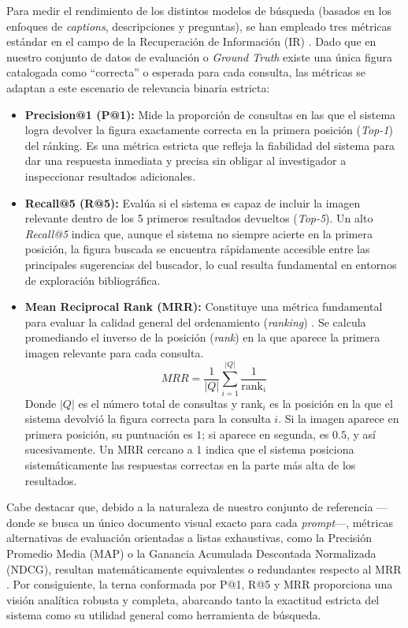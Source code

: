 \documentclass[a4paper]{report}
\begin{document}
Para medir el rendimiento de los distintos modelos de búsqueda (basados en los enfoques de \textit{captions}, descripciones y preguntas), se han empleado tres métricas estándar en el campo de la Recuperación de Información (IR) \cite{manning2008introduction}. Dado que en nuestro conjunto de datos de evaluación o \textit{Ground Truth} existe una única figura catalogada como ``correcta'' o esperada para cada consulta, las métricas se adaptan a este escenario de relevancia binaria estricta:

\begin{itemize}
    \item \textbf{Precision@1 (P@1):} Mide la proporción de consultas en las que el sistema logra devolver la figura exactamente correcta en la primera posición (\textit{Top-1}) del ránking. Es una métrica estricta que refleja la fiabilidad del sistema para dar una respuesta inmediata y precisa sin obligar al investigador a inspeccionar resultados adicionales.
    
    \item \textbf{Recall@5 (R@5):} Evalúa si el sistema es capaz de incluir la imagen relevante dentro de los 5 primeros resultados devueltos (\textit{Top-5}). Un alto \textit{Recall@5} indica que, aunque el sistema no siempre acierte en la primera posición, la figura buscada se encuentra rápidamente accesible entre las principales sugerencias del buscador, lo cual resulta fundamental en entornos de exploración bibliográfica.
    
    \item \textbf{Mean Reciprocal Rank (MRR):} Constituye una métrica fundamental para evaluar la calidad general del ordenamiento (\textit{ranking}) \cite{craswell2009mean}. Se calcula promediando el inverso de la posición (\textit{rank}) en la que aparece la primera imagen relevante para cada consulta.
    \begin{equation}
        MRR = \frac{1}{|Q|} \sum_{i=1}^{|Q|} \frac{1}{\text{rank}_i}
    \end{equation}
    Donde $|Q|$ es el número total de consultas y $\text{rank}_i$ es la posición en la que el sistema devolvió la figura correcta para la consulta $i$. Si la imagen aparece en primera posición, su puntuación es $1$; si aparece en segunda, es $0.5$, y así sucesivamente. Un MRR cercano a 1 indica que el sistema posiciona sistemáticamente las respuestas correctas en la parte más alta de los resultados.
\end{itemize}

Cabe destacar que, debido a la naturaleza de nuestro conjunto de referencia —donde se busca un único documento visual exacto para cada \textit{prompt}—, métricas alternativas de evaluación orientadas a listas exhaustivas, como la Precisión Promedio Media (MAP) o la Ganancia Acumulada Descontada Normalizada (NDCG), resultan matemáticamente equivalentes o redundantes respecto al MRR \cite{manning2008introduction}. Por consiguiente, la terna conformada por P@1, R@5 y MRR proporciona una visión analítica robusta y completa, abarcando tanto la exactitud estricta del sistema como su utilidad general como herramienta de búsqueda.
\end{document}
